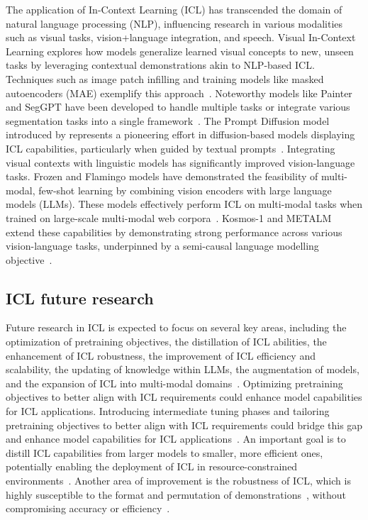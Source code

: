 The application of In-Context Learning (ICL) has transcended the domain of natural language processing (NLP), influencing research in various modalities such as visual tasks, vision+language integration, and speech.
Visual In-Context Learning explores how models generalize learned visual concepts to new, unseen tasks by leveraging contextual demonstrations akin to NLP-based ICL. Techniques such as image patch infilling and training models like masked autoencoders (MAE) exemplify this approach~\cite{bar2022visual}.
Noteworthy models like Painter and SegGPT have been developed to handle multiple tasks or integrate various segmentation tasks into a single framework~\cite{wang2023images, wang2023seggpt}.
The Prompt Diffusion model introduced by \textcite{wang2023incontext} represents a pioneering effort in diffusion-based models displaying ICL capabilities, particularly when guided by textual prompts~\cite{wang2023incontext}.
Integrating visual contexts with linguistic models has significantly improved vision-language tasks.
Frozen and Flamingo models have demonstrated the feasibility of multi-modal, few-shot learning by combining vision encoders with large language models (LLMs).
These models effectively perform ICL on multi-modal tasks when trained on large-scale multi-modal web corpora~\cite{tsimpoukelli2021frozen, alayrac2022flamingo}.
Kosmos-1 and METALM extend these capabilities by demonstrating strong performance across various vision-language tasks, underpinned by a semi-causal language modelling objective~\cite{huang2023language, hao2022language}.

\subsection{ICL future research}
\label{subsec:icl-future}

Future research in ICL is expected to focus on several key areas, including the optimization of pretraining objectives, the distillation of ICL abilities, the enhancement of ICL robustness, the improvement of ICL efficiency and scalability, the updating of knowledge within LLMs, the augmentation of models, and the expansion of ICL into multi-modal domains~\cite{dong2023survey}.
Optimizing pretraining objectives to better align with ICL requirements could enhance model capabilities for ICL applications.
Introducing intermediate tuning phases and tailoring pretraining objectives to better align with ICL requirements could bridge this gap and enhance model capabilities for ICL applications~\cite{shin2022effect}.
An important goal is to distill ICL capabilities from larger models to smaller, more efficient ones, potentially enabling the deployment of ICL in resource-constrained environments~\cite{magister2022teaching}.
Another area of improvement is the robustness of ICL, which is highly susceptible to the format and permutation of demonstrations~\cite{zhao2021calibrate, lu2022fantastically}, without compromising accuracy or efficiency~\cite{chen2024relation}.

